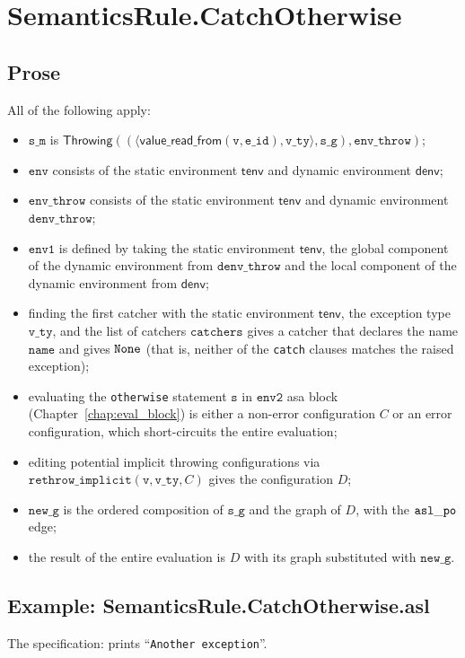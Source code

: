 \documentclass{book}
\newcommand\chapref[1]{Chapter~\ref{chap:#1}}
\newcommand\tenv[0]{\textsf{tenv}}
\newcommand\denv[0]{\textsf{denv}}
\newcommand\ProseOrError[0]{or an error configuration, which short-circuits the entire evaluation}
\newcommand\rethrowimplicit[0]{\texttt{rethrow\_implicit}}
\newcommand\valuereadfrom[0]{\textsf{value\_read\_from}}
\newcommand\Throwing[0]{\textsf{Throwing}}
\newcommand\env[0]{\texttt{env}}
\newcommand\envone[0]{\texttt{env1}}
\newcommand\envtwo[0]{\texttt{env2}}
\newcommand\newg[0]{\texttt{new\_g}}
\newcommand\vv[0]{\texttt{v}}
\newcommand\vs[0]{\texttt{s}}
\newcommand\name[0]{\texttt{name}}
\newcommand\catchers[0]{\texttt{catchers}}
\newcommand\envthrow[0]{\texttt{env\_throw}}
\newcommand\denvthrow[0]{\texttt{denv\_throw}}
\newcommand\sm[0]{\texttt{s\_m}}
\newcommand\sg[0]{\texttt{s\_g}}
\newcommand\vvty[0]{\texttt{v\_ty}}
\newcommand\eid[0]{\texttt{e\_id}}
\begin{document}

\section{SemanticsRule.CatchOtherwise \label{sec:SemanticsRule.CatchOtherwise}}
  \subsection{Prose}
  All of the following apply:
  \begin{itemize}
    \item $\sm$ is $\Throwing((\langle \valuereadfrom(\vv, \eid), \vvty \rangle, \sg), \envthrow)$;
    \item $\env$ consists of the static environment $\tenv$ and dynamic environment $\denv$;
    \item $\envthrow$ consists of the static environment $\tenv$ and dynamic environment \\ $\denvthrow$;
    \item $\envone$ is defined by taking the static environment $\tenv$, the global component of the dynamic
    environment from $\denvthrow$ and the local component of the dynamic environment from $\denv$;
    \item finding the first catcher with the static environment $\tenv$, the exception type $\vvty$,
    and the list of catchers $\catchers$ gives a catcher that declares the name $\name$ and gives $\texttt{None}$
    (that is, neither of the \texttt{catch} clauses matches the raised exception);
    \item evaluating the \texttt{otherwise} statement $\vs$ in $\envtwo$ asa block (\chapref{eval_block})
    is either a non-error configuration $C$ \ProseOrError;
    \item editing potential implicit throwing configurations via $\rethrowimplicit(\vv, \vvty, C)$
    gives the configuration $D$;
    \item $\newg$ is the ordered composition of $\sg$ and the graph of $D$,
    with the $\mathtt{asl\_po}$ edge;
    \item the result of the entire evaluation is $D$ with its graph substituted with $\newg$.
  \end{itemize}

    \subsection{Example: SemanticsRule.CatchOtherwise.asl}
     The specification:
     prints ``\texttt{Another exception}''.
\end{document}
